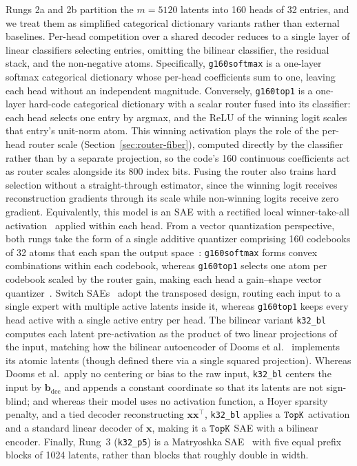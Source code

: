 Rungs 2a and 2b partition the $m{=}5120$ latents into 160 heads of 32
entries, and we treat them as simplified categorical dictionary variants
rather than external baselines. Per-head competition over a shared decoder
reduces to a single layer of linear classifiers selecting entries, omitting
the bilinear classifier, the residual stack, and the non-negative atoms.
Specifically, \texttt{g160softmax} is a one-layer softmax categorical
dictionary whose per-head coefficients sum to one, leaving each head
without an independent magnitude. Conversely, \texttt{g160top1} is a
one-layer hard-code categorical dictionary with a scalar router fused into
its classifier: each head selects one entry by argmax, and the ReLU of the
winning logit scales that entry's unit-norm atom. This winning activation
plays the role of the per-head router scale
(Section~\ref{sec:router-fiber}), computed directly by the classifier
rather than by a separate projection, so the code's 160 continuous
coefficients act as router scales alongside its 800 index bits. Fusing the
router also trains hard selection without a straight-through estimator,
since the winning logit receives reconstruction gradients through its
scale while non-winning logits receive zero gradient. Equivalently, this
model is an SAE with a rectified local winner-take-all
activation~\cite{srivastava2013} applied within each head. From a vector
quantization perspective, both rungs take the form of a single additive
quantizer comprising 160 codebooks of 32 atoms that each span the output
space~\cite{babenko2014}: \texttt{g160softmax} forms convex combinations
within each codebook, whereas \texttt{g160top1} selects one atom per
codebook scaled by the router gain, making each head a gain--shape vector
quantizer~\cite{aharon2006}. Switch SAEs~\cite{mudide2025} adopt the
transposed design, routing each input to a single expert with multiple
active latents inside it, whereas \texttt{g160top1} keeps every head active
with a single active entry per head. The bilinear variant \texttt{k32\_bl}
computes each latent pre-activation as the product of two linear
projections of the input, matching how the bilinear autoencoder of Dooms
et al.~\cite{dooms2026} implements its atomic latents (though defined there
via a single squared projection). Whereas Dooms et al.\ apply no centering
or bias to the raw input, \texttt{k32\_bl} centers the input by
$\mathbf{b}_{\mathrm{dec}}$ and appends a constant coordinate so that its
latents are not sign-blind; and whereas their model uses no activation
function, a Hoyer sparsity penalty, and a tied decoder reconstructing
$\mathbf{x}\mathbf{x}^\top$, \texttt{k32\_bl} applies a $\mathop{\mathtt{TopK}}\limits$ activation
and a standard linear decoder of $\mathbf{x}$, making it a $\mathop{\mathtt{TopK}}\limits$ SAE with
a bilinear encoder. Finally, Rung~3 (\texttt{k32\_p5}) is a Matryoshka
SAE~\cite{bussmann2025} with five equal prefix blocks of 1024 latents,
rather than blocks that roughly double in width.

